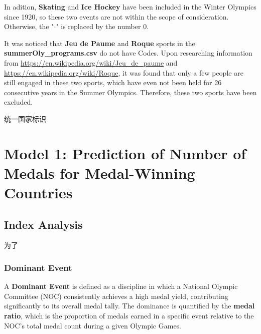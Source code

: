 \documentclass{mcmthesis}
\begin{document}
In adition, \textbf{Skating} and \textbf{Ice Hockey} have been included in the Winter Olympics since 1920, so these two events are not within the scope of consideration. Otherwise, the "$\cdot$" is replaced by the number $0$. 

It was noticed that \textbf{Jeu de Paume} and \textbf{Roque} sports in the {\bf summerOly\_programs.csv} do not have Codes. Upon researching information from {\color{blue}\url{https://en.wikipedia.org/wiki/Jeu_de_paume}} and {\color{blue}\url{https://en.wikipedia.org/wiki/Roque}}, it was found that only a few people are still engaged in these two sports, which have even not been held for 26 consecutive years in the Summer Olympics. Therefore, these two sports have been excluded.



统一国家标识













\section{Model 1: Prediction of Number of Medals for Medal-Winning Countries}

\subsection{Index Analysis}
为了


\subsubsection{Dominant Event}

A \textbf{Dominant Event} is defined as a discipline in which a National Olympic Committee (NOC) consistently achieves a high medal yield, contributing significantly to its overall medal tally. The dominance is quantified by the \textbf{medal ratio}, which is the proportion of medals earned in a specific event relative to the NOC's total medal count during a given Olympic Games.
\end{document}
